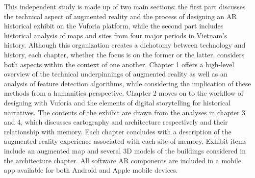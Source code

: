 This independent study is made up of two main sections: the first part discusses the technical aspect of augmented reality and the process of designing an AR historical exhibit on the Vuforia platform, while the second part includes historical analysis of maps and sites from four major periods in Vietnam’s history. Although this organization creates a dichotomy between technology and history, each chapter, whether the focus is on the former or the latter, considers both aspects within the context of one another. Chapter 1 offers a high-level overview of the technical underpinnings of augmented reality as well as an analysis of feature detection algorithms, while considering the implication of these methods from a humanities perspective. Chapter 2 moves on to the workflow of designing with Vuforia and the elements of digital storytelling for historical narratives. The contents of the exhibit are drawn from the analyses in chapter 3 and 4, which discusses cartography and architecture respectively and their relationship with memory. Each chapter concludes with a description of the augmented reality experience associated with each site of memory. Exhibit items include an augmented map and several 3D models of the buildings considered in the architecture chapter. All software AR components are included in a mobile app available for both Android and Apple mobile devices.

\en
